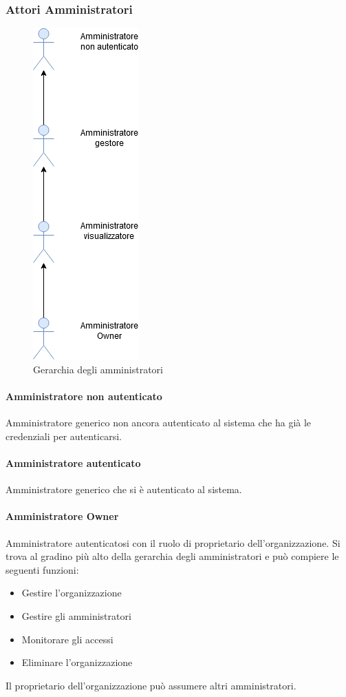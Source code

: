 \subsubsection{Attori Amministratori}
\begin{figure}[h]
  \caption{Gerarchia degli amministratori}
  \centering
    \includegraphics[scale=0.6]{sezioni/UseCase/Immagini/Amministratori.png}
\end{figure}


\paragraph{Amministratore non autenticato}
Amministratore generico non ancora autenticato al sistema che ha già le credenziali per autenticarsi.
\paragraph{Amministratore autenticato}
Amministratore generico che si è autenticato al sistema.
\paragraph{Amministratore Owner}
Amministratore autenticatosi con il ruolo di proprietario dell'organizzazione.
Si trova al gradino più alto della gerarchia degli amministratori e può compiere le seguenti funzioni:
\begin{itemize}
\item Gestire l'organizzazione
\item Gestire gli amministratori
\item Monitorare gli accessi
\item Eliminare l'organizzazione
\end{itemize}
Il proprietario dell'organizzazione può assumere altri amministratori.
